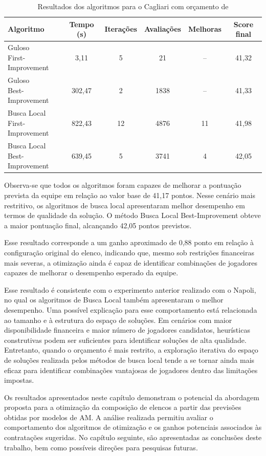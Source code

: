 \begin{table}[hbt]
\centering
\caption{Resultados dos algoritmos para o Cagliari com orçamento de }
\label{tab:cagliari_orcamento}

\begin{tabular}{lccccc}
\hline
Algoritmo & Tempo (s) & Iterações & Avaliações & Melhoras & Score final \\
\hline
\makecell[l]{Guloso \\ First-Improvement} & 3,11 & 5 & 21 & -- & 41,32 \\[4pt]
\makecell[l]{Guloso \\ Best-Improvement} & 302,47 & 2 & 1838 & -- & 41,33 \\[6pt]
\makecell[l]{Busca Local \\ First-Improvement} & 822,43 & 12 & 4876 & 11 & 41,98 \\[4pt]
\makecell[l]{Busca Local \\ Best-Improvement} & 639,45 & 5 & 3741 & 4 & 42,05 \\
\hline
\end{tabular}

\vspace{.3cm}
\end{table}

Observa-se que todos os algoritmos foram capazes de melhorar a pontuação prevista da 
equipe em relação ao valor base de 41,17 pontos. 
Nesse cenário mais restritivo, os algoritmos de busca local apresentaram melhor 
desempenho em termos de qualidade da solução. 
O método Busca Local Best-Improvement obteve a maior pontuação final, 
alcançando 42,05 pontos previstos.

Esse resultado corresponde a um ganho aproximado de 0,88 ponto em relação à 
configuração original do elenco, indicando que, mesmo sob restrições financeiras 
mais severas, a otimização ainda é capaz de identificar combinações de jogadores 
capazes de melhorar o desempenho esperado da equipe.

Esse resultado é consistente com o experimento anterior realizado com o Napoli, no 
qual os algoritmos de Busca Local também apresentaram o melhor desempenho. 
Uma possível explicação para esse comportamento está relacionada ao tamanho e à estrutura 
do espaço de soluções. Em cenários com maior disponibilidade financeira 
e maior número de jogadores candidatos, heurísticas construtivas podem ser 
suficientes para identificar soluções de alta qualidade. 
Entretanto, quando o orçamento é mais restrito, a exploração iterativa do espaço 
de soluções realizada pelos métodos de busca local tende a se tornar ainda mais eficaz 
para identificar combinações vantajosas de jogadores dentro das limitações impostas.

Os resultados apresentados neste capítulo demonstram o potencial da abordagem 
proposta para a otimização da composição de elencos a partir das previsões obtidas 
por modelos de AM. A análise realizada permitiu avaliar o comportamento dos 
algoritmos de otimização e os ganhos potenciais associados às contratações sugeridas. 
No capítulo seguinte, são apresentadas as conclusões deste trabalho, bem 
como possíveis direções para pesquisas futuras.